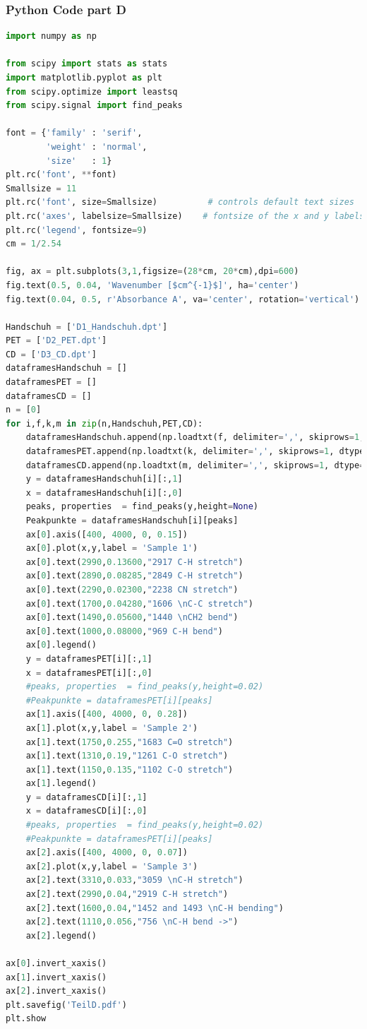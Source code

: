 \documentclass[a4paper,abstracton]{article}	                       %
\begin{document}
\subsubsection*{Python Code part D}
\begin{lstlisting}[language=Python]
import numpy as np

from scipy import stats as stats
import matplotlib.pyplot as plt
from scipy.optimize import leastsq
from scipy.signal import find_peaks

font = {'family' : 'serif',
        'weight' : 'normal',
        'size'   : 1}
plt.rc('font', **font)
Smallsize = 11
plt.rc('font', size=Smallsize)          # controls default text sizes
plt.rc('axes', labelsize=Smallsize)    # fontsize of the x and y labels
plt.rc('legend', fontsize=9)  
cm = 1/2.54

fig, ax = plt.subplots(3,1,figsize=(28*cm, 20*cm),dpi=600)  
fig.text(0.5, 0.04, 'Wavenumber [$cm^{-1}$]', ha='center')
fig.text(0.04, 0.5, r'Absorbance A', va='center', rotation='vertical') 

Handschuh = ['D1_Handschuh.dpt']
PET = ['D2_PET.dpt']
CD = ['D3_CD.dpt']
dataframesHandschuh = []
dataframesPET = []
dataframesCD = []
n = [0]
for i,f,k,m in zip(n,Handschuh,PET,CD):
    dataframesHandschuh.append(np.loadtxt(f, delimiter=',', skiprows=1, dtype=float))
    dataframesPET.append(np.loadtxt(k, delimiter=',', skiprows=1, dtype=float))
    dataframesCD.append(np.loadtxt(m, delimiter=',', skiprows=1, dtype=float))
    y = dataframesHandschuh[i][:,1]
    x = dataframesHandschuh[i][:,0]
    peaks, properties  = find_peaks(y,height=None)
    Peakpunkte = dataframesHandschuh[i][peaks]
    ax[0].axis([400, 4000, 0, 0.15])
    ax[0].plot(x,y,label = 'Sample 1')
    ax[0].text(2990,0.13600,"2917 C-H stretch")
    ax[0].text(2890,0.08285,"2849 C-H stretch")
    ax[0].text(2290,0.02300,"2238 CN stretch")
    ax[0].text(1700,0.04280,"1606 \nC-C stretch")
    ax[0].text(1490,0.05600,"1440 \nCH2 bend")
    ax[0].text(1000,0.08000,"969 C-H bend")
    ax[0].legend()
    y = dataframesPET[i][:,1]
    x = dataframesPET[i][:,0]
    #peaks, properties  = find_peaks(y,height=0.02)
    #Peakpunkte = dataframesPET[i][peaks]
    ax[1].axis([400, 4000, 0, 0.28])
    ax[1].plot(x,y,label = 'Sample 2')
    ax[1].text(1750,0.255,"1683 C=O stretch")
    ax[1].text(1310,0.19,"1261 C-O stretch")
    ax[1].text(1150,0.135,"1102 C-O stretch")
    ax[1].legend()
    y = dataframesCD[i][:,1]
    x = dataframesCD[i][:,0]
    #peaks, properties  = find_peaks(y,height=0.02)
    #Peakpunkte = dataframesPET[i][peaks]
    ax[2].axis([400, 4000, 0, 0.07])
    ax[2].plot(x,y,label = 'Sample 3')
    ax[2].text(3310,0.033,"3059 \nC-H stretch")
    ax[2].text(2990,0.04,"2919 C-H stretch")
    ax[2].text(1600,0.04,"1452 and 1493 \nC-H bending")
    ax[2].text(1110,0.056,"756 \nC-H bend ->")
    ax[2].legend()

ax[0].invert_xaxis()
ax[1].invert_xaxis()
ax[2].invert_xaxis()
plt.savefig('TeilD.pdf')
plt.show
\end{lstlisting}
\end{document}
